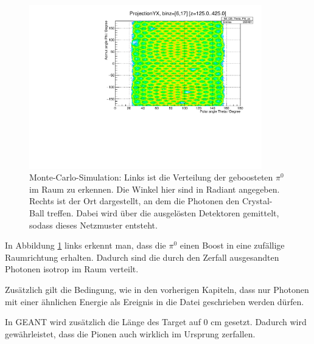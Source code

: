 \documentclass[a4paper,11pt,oneside,final,german,openbib,pdftex]{scrbook}
\begin{document}
{\begin{figure}[h!]
\begin{minipage}{0.45\textwidth}
		\end{minipage}
	\hfill
	\begin{minipage}{0.45\textwidth}
		\centering
		\includegraphics[width=0.9\textwidth]{20171204DistributionPhotonUrsprungIsotrop}
	\end{minipage}
\caption[Simulation:Symmetrische Photonen Verteilung der Mesonen und detektierten Photonen im CB bei isotropen Zerfall] {Monte-Carlo-Simulation: Links ist die Verteilung der geboosteten $\pi^0$ im Raum zu erkennen. Die Winkel hier sind in Radiant angegeben. Rechts ist der Ort dargestellt, an dem die Photonen den Crystal-Ball treffen. Dabei wird \"uber die ausgel\"osten Detektoren gemittelt, sodass dieses Netzmuster entsteht.}
\label{fig:Verteilung-von-Mesonen-und-Photonen-im-Raum}
\end{figure}

In Abbildung \ref{fig:Verteilung-von-Mesonen-und-Photonen-im-Raum} links erkennt man, dass die $\pi^0$ einen Boost in eine zuf\"allige Raumrichtung erhalten. Dadurch sind die durch den Zerfall ausgesandten Photonen isotrop im Raum verteilt.


Zus\"atzlich gilt die Bedingung, wie in den vorherigen Kapiteln, dass nur Photonen mit einer ähnlichen Energie als Ereignis in die Datei geschrieben werden d\"urfen.

In GEANT wird zus\"atzlich die Länge des Target auf 0 cm gesetzt. Dadurch wird gewährleistet, dass die Pionen auch wirklich im Ursprung zerfallen.



}
\end{document}
